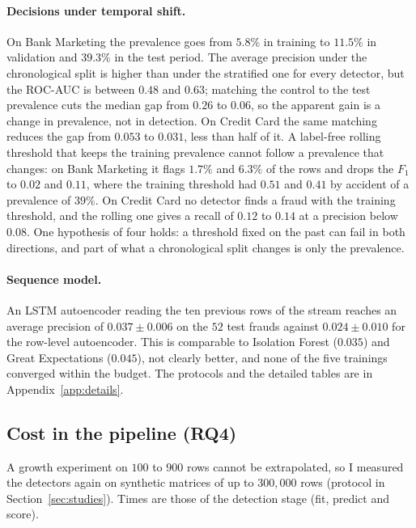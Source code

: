 \documentclass[conference]{IEEEtran}
\begin{document}
\paragraph{Decisions under temporal shift.} On Bank Marketing the prevalence goes from $5.8\%$ in
training to $11.5\%$ in validation and $39.3\%$ in the test period. The average precision under the
chronological split is higher than under the stratified one for every detector, but the ROC-AUC is
between $0.48$ and $0.63$; matching the control to the test prevalence cuts the median gap from
$0.26$ to $0.06$, so the apparent gain is a change in prevalence, not in detection. On Credit Card
the same matching reduces the gap from $0.053$ to $0.031$, less than half of it. A label-free
rolling threshold that keeps the training prevalence cannot follow a prevalence that changes: on
Bank Marketing it flags $1.7\%$ and $6.3\%$ of the rows and drops the $F_1$ to $0.02$ and $0.11$,
where the training threshold had $0.51$ and $0.41$ by accident of a prevalence of $39\%$. On
Credit Card no detector finds a fraud with the training threshold, and the rolling one gives a
recall of $0.12$ to $0.14$ at a precision below $0.08$. One hypothesis of four holds: a threshold
fixed on the past can fail in both directions, and part of what a chronological split changes is
only the prevalence.

\paragraph{Sequence model.} An LSTM autoencoder reading the ten previous rows of the stream reaches
an average precision of $0.037 \pm 0.006$ on the $52$ test frauds against $0.024 \pm 0.010$ for the
row-level autoencoder. This is comparable to Isolation Forest ($0.035$) and Great Expectations
($0.045$), not clearly better, and none of the five trainings converged within the budget. The
protocols and the detailed tables are in Appendix~\ref{app:details}.

\subsection{Cost in the pipeline (RQ4)}
\label{sec:cost}
A growth experiment on $100$ to $900$ rows cannot be extrapolated, so I measured the
detectors again on synthetic matrices of up to $300{,}000$ rows (protocol in
Section~\ref{sec:studies}). Times are those of the detection stage (fit, predict and score).
\end{document}
